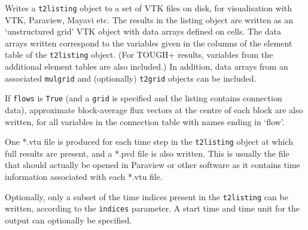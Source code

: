 Writes a \texttt{t2listing} object to a set of VTK files on disk, for visualisation with VTK, Paraview, Mayavi etc.  The results in the listing object are written as an `unstructured grid' VTK object with data arrays defined on cells.  The data arrays written correspond to the variables given in the columns of the element table of the \texttt{t2listing} object.  (For TOUGH+ results, variables from the additional element tables are also included.) In addition, data arrays from an associated \texttt{mulgrid} and (optionally) \texttt{t2grid} objects can be included.

If \texttt{flows} is \texttt{True} (and a \texttt{grid} is specified and the listing contains connection data), approximate block-average flux vectors at the centre of each block are also written, for all variables in the connection table with names ending in `flow'.

One *.vtu file is produced for each time step in the \texttt{t2listing} object at which full results are present, and a *.pvd file is also written.  This is usually the file that should actually be opened in Paraview or other software as it contains time information associated with each *.vtu file.

Optionally, only a subset of the time indices present in the \texttt{t2listing} can be written, according to the \texttt{indices} parameter.  A start time and time unit for the output can optionally be specified.

